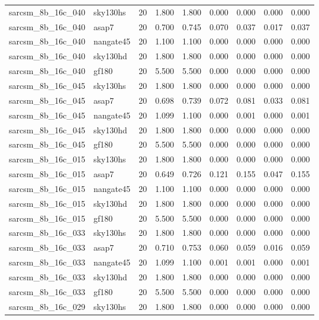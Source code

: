 \begin{tabular}{llrrrrrrr}
sarcsm\_8b\_16c\_040 & sky130hs & 20 & 1.800 & 1.800 & 0.000 & 0.000 & 0.000 & 0.000 \\
sarcsm\_8b\_16c\_040 & asap7 & 20 & 0.700 & 0.745 & 0.070 & 0.037 & 0.017 & 0.037 \\
sarcsm\_8b\_16c\_040 & nangate45 & 20 & 1.100 & 1.100 & 0.000 & 0.000 & 0.000 & 0.000 \\
sarcsm\_8b\_16c\_040 & sky130hd & 20 & 1.800 & 1.800 & 0.000 & 0.000 & 0.000 & 0.000 \\
sarcsm\_8b\_16c\_040 & gf180 & 20 & 5.500 & 5.500 & 0.000 & 0.000 & 0.000 & 0.000 \\
sarcsm\_8b\_16c\_045 & sky130hs & 20 & 1.800 & 1.800 & 0.000 & 0.000 & 0.000 & 0.000 \\
sarcsm\_8b\_16c\_045 & asap7 & 20 & 0.698 & 0.739 & 0.072 & 0.081 & 0.033 & 0.081 \\
sarcsm\_8b\_16c\_045 & nangate45 & 20 & 1.099 & 1.100 & 0.000 & 0.001 & 0.000 & 0.001 \\
sarcsm\_8b\_16c\_045 & sky130hd & 20 & 1.800 & 1.800 & 0.000 & 0.000 & 0.000 & 0.000 \\
sarcsm\_8b\_16c\_045 & gf180 & 20 & 5.500 & 5.500 & 0.000 & 0.000 & 0.000 & 0.000 \\
sarcsm\_8b\_16c\_015 & sky130hs & 20 & 1.800 & 1.800 & 0.000 & 0.000 & 0.000 & 0.000 \\
sarcsm\_8b\_16c\_015 & asap7 & 20 & 0.649 & 0.726 & 0.121 & 0.155 & 0.047 & 0.155 \\
sarcsm\_8b\_16c\_015 & nangate45 & 20 & 1.100 & 1.100 & 0.000 & 0.000 & 0.000 & 0.000 \\
sarcsm\_8b\_16c\_015 & sky130hd & 20 & 1.800 & 1.800 & 0.000 & 0.000 & 0.000 & 0.000 \\
sarcsm\_8b\_16c\_015 & gf180 & 20 & 5.500 & 5.500 & 0.000 & 0.000 & 0.000 & 0.000 \\
sarcsm\_8b\_16c\_033 & sky130hs & 20 & 1.800 & 1.800 & 0.000 & 0.000 & 0.000 & 0.000 \\
sarcsm\_8b\_16c\_033 & asap7 & 20 & 0.710 & 0.753 & 0.060 & 0.059 & 0.016 & 0.059 \\
sarcsm\_8b\_16c\_033 & nangate45 & 20 & 1.099 & 1.100 & 0.001 & 0.001 & 0.000 & 0.001 \\
sarcsm\_8b\_16c\_033 & sky130hd & 20 & 1.800 & 1.800 & 0.000 & 0.000 & 0.000 & 0.000 \\
sarcsm\_8b\_16c\_033 & gf180 & 20 & 5.500 & 5.500 & 0.000 & 0.000 & 0.000 & 0.000 \\
sarcsm\_8b\_16c\_029 & sky130hs & 20 & 1.800 & 1.800 & 0.000 & 0.000 & 0.000 & 0.000 \\

\end{tabular}

